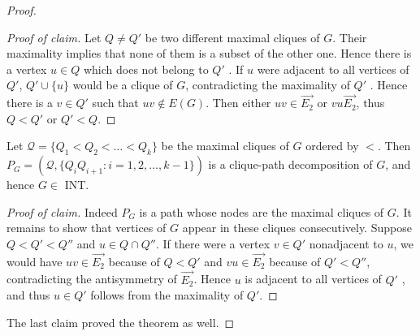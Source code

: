 \begin{proof}
\begin{enumerate}
		\begin{proof}[Proof of claim]
			Let $Q \neq Q'$ be two different maximal cliques of $G$. Their maximality implies that none of them is a subset of the other one. Hence there is a vertex $u \in Q$ which does not belong to $Q'$ . If $u$ were adjacent to all vertices of $Q'$, $Q' \cup \{u\}$ would be a clique of $G$, contradicting the maximality of $Q'$ . Hence there is a $v \in Q'$ such that $uv \notin E(G)$. Then either $uv \in \overrightarrow{E_2}$ or $vu \overrightarrow{E_2}$, thus $Q < Q'$ or $Q' < Q$.
		\end{proof}
		
		\begin{claim}
			Let $\mathcal{Q} = \{Q_1 < Q_2 < \dots < Q_k\}$ be the maximal cliques of $G$ ordered by $<$. Then $P_G = (\mathcal{Q}, \{Q_i Q_{i+1}: i = 1, 2, \dots, k - 1\})$ is a clique-path decomposition of $G$, and hence $G \in$ INT.
		\end{claim}
		
		\begin{proof}[Proof of claim]
			Indeed $P_G$ is a path whose nodes are the maximal cliques of $G$. It remains to show that vertices of $G$ appear in these cliques consecutively. Suppose $Q < Q' < Q''$ and $u \in Q \cap Q''$. If there were a vertex $v \in Q'$ nonadjacent to $u$, we would have $uv \in \overrightarrow{E_2}$ because of $Q < Q'$ and $vu \in \overrightarrow{E_2}$ because of $Q' < Q''$, contradicting the antisymmetry of $\overrightarrow{E_2}$. Hence $u$ is adjacent to all vertices of $Q'$ , and thus
			$u \in Q'$ follows from the maximality of $Q'$.
		\end{proof}
	\end{enumerate}
	
	The last claim proved the theorem as well.
\end{proof}